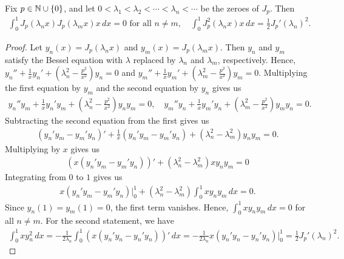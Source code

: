 Fix $p \in \mathbb{N} \cup \{0\}$, and let $0 < \lambda_{1} < \lambda_{2} < \cdots < \lambda_{n} < \cdots$ be the zeroes of $J_{p}$. Then
\begin{align}
    \int_{0}^{1} J_{p}(\lambda_{n} x) J_{p}(\lambda_{m} x) x \, dx = 0 \text{ for all } n \neq m, \quad \int_{0}^{1} J_{p}^{2}(\lambda_{n} x) x \, dx = \frac{1}{2} J_{p}'(\lambda_{n})^{2}.
\end{align}
\begin{proof}
    Let $y_{n}(x) = J_{p}(\lambda_{n} x)$ and $y_{m}(x) = J_{p}(\lambda_{m} x)$. Then $y_{n}$ and $y_{m}$ satisfy the Bessel equation with $\lambda$ replaced by $\lambda_{n}$ and $\lambda_{m}$, respectively. Hence, $y_{n}'' + \frac{1}{x} y_{n}' + (\lambda_{n}^{2} - \frac{p^{2}}{x^{2}}) y_{n} = 0$ and $y_{m}'' + \frac{1}{x} y_{m}' + (\lambda_{m}^{2} - \frac{p^{2}}{x^{2}}) y_{m} = 0$. Multiplying the first equation by $y_{m}$ and the second equation by $y_{n}$ gives us
    \begin{align}
        y_{n}'' y_{m} + \frac{1}{x} y_{n}' y_{m} + (\lambda_{n}^{2} - \frac{p^{2}}{x^{2}}) y_{n} y_{m} = 0, \quad y_{m}'' y_{n} + \frac{1}{x} y_{m}' y_{n} + (\lambda_{m}^{2} - \frac{p^{2}}{x^{2}}) y_{m} y_{n} = 0.
    \end{align}
    Subtracting the second equation from the first gives us
    \begin{align}
        (y_{n}' y_{m} - y_{m}' y_{n})' + \frac{1}{x}(y_{n}' y_{m} - y_{m}' y_{n}) + (\lambda_{n}^{2}-\lambda_{m}^{2}) y_{n} y_{m} = 0.
    \end{align}
    Multiplying by $x$ gives us
    \begin{align}
        (x(y_{n}' y_{m}-y_{m}' y_{n}))' + (\lambda_{n}^{2}-\lambda_{m}^{2}) x y_{n} y_{m} = 0
    \end{align}
    Integrating from $0$ to $1$ gives us
    \begin{align}
        x(y_{n}' y_{m} - y_{m}' y_{n}) \Big|_{0}^{1} + (\lambda_{n}^{2}-\lambda_{m}^{2}) \int_{0}^{1} x y_{n} y_{m} \, dx = 0.
    \end{align}
    Since $y_{n}(1) = y_{m}(1) = 0$, the first term vanishes. Hence, $\int_{0}^{1} x y_{n} y_{m} \, dx = 0$ for all $n \neq m$. For the second statement, we have
    \begin{align}
        \int_{0}^{1} x y_{n}^{2} \, dx = -\frac{1}{2 \lambda_{n}} \int_{0}^{1} (x(y_{n}' y_{n} - y_{n}' y_{n}))' \, dx = -\frac{1}{2 \lambda_{n}} x(y_{n}' y_{n} - y_{n}' y_{n}) \Big|_{0}^{1} = \frac{1}{2} J_{p}'(\lambda_{n})^{2}.
    \end{align}
\end{proof}